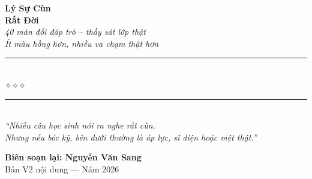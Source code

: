 \begin{titlepage}
\begin{center}
  {\fontsize{34}{40}\selectfont\bfseries\color{inkdark!80!black}
    Lý Sự Cùn}\\[0.35cm]
  {\fontsize{34}{40}\selectfont\bfseries\color{sunclay!85!black}
    Rất Đời}\\[0.4cm]

  {\fontsize{16}{20}\selectfont\color{sunclay!90!black}\itshape
    40 màn đối đáp trò -- thầy sát lớp thật\\
    Ít màu hồng hơn, nhiều va chạm thật hơn}\\[1cm]

  {\color{chalkgreen!60}\rule{6cm}{1pt}}\\[5pt]
  {\color{sunclay!80!black}\large$\diamond$\hspace{1cm}$\diamond$\hspace{1cm}$\diamond$}\\[5pt]
  {\color{chalkgreen!60}\rule{6cm}{1pt}}\\[1.5cm]

  {\normalsize\itshape\color{chalkgreen!90!black}
   ``Nhiều câu học sinh nói ra nghe rất cùn.\\
   Nhưng nếu bóc kỹ, bên dưới thường là áp lực, sĩ diện hoặc mệt thật.''}

  \vfill

  {\fontsize{16}{20}\selectfont\bfseries\color{chalkgreen!90!black}
    Biên soạn lại: \textbf{Nguyễn Văn Sang}}\\[0.4cm]

  {\small\color{gray} Bản V2 nội dung --- Năm 2026}\\[0.5cm]
\end{center}

\afterpage{\nopagecolor}
\end{titlepage}